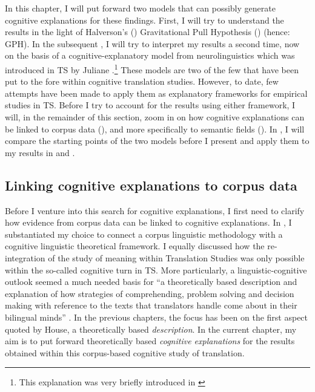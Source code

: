 In this chapter, I will put forward two models that can possibly generate cognitive explanations for these findings. First, I will try to understand the results in the light of Halverson’s (\citeyear{halverson_cognitive_2003, shreve_cognitive_2010, rojo_implications_2013, de_sutter_developing_2017}) Gravitational Pull Hypothesis () (hence: GPH). In the subsequent , I will try to interpret my results a second time, now on the basis of a cognitive-explanatory model from neurolinguistics \citep{paradis_neurolinguistic_2004, kecskes_neurofunctional_2007} which was introduced in TS by Juliane \citet{house_towards_2013}.\footnote{This explanation was very briefly introduced in \citet{VandevoordeEtAl2017}} These models are two of the few that have been put to the fore within cognitive translation studies. However, to date, few attempts have been made to apply them as explanatory frameworks for empirical studies in TS. Before I try to account for the results using either framework, I will, in the remainder of this section, zoom in on how cognitive explanations can be linked to corpus data (), and more specifically to semantic fields (). In , I will compare the starting points of the two models before I present and apply them to my results in  and . 

\subsection{Linking cognitive explanations to corpus data}
\label{sec:5.1.1}  
Before I venture into this search for cognitive explanations, I first need to clarify how evidence from corpus data can be linked to cognitive explanations. In , I substantiated my choice to connect a corpus linguistic methodology with a cognitive linguistic theoretical framework. I equally discussed how the re-integration of the study of meaning within Translation Studies was only possible within the so-called cognitive turn in TS. More particularly, a linguistic-cognitive outlook seemed a much needed basis for “a theoretically based description and explanation of how strategies of comprehending, problem solving and decision making with reference to the texts that translators handle come about in their bilingual minds” \citep[48]{house_towards_2013}. In the previous chapters, the focus has been on the first aspect quoted by House, a theoretically based \textit{description}. In the current chapter, my aim is to put forward theoretically based \textit{cognitive explanations} for the results obtained within this corpus-based cognitive study of translation.

